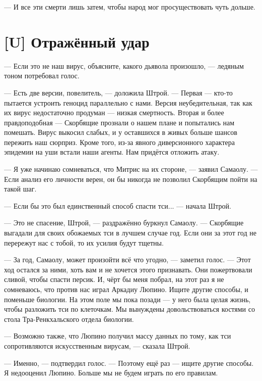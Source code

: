 --- И все эти смерти лишь затем, чтобы народ мог просуществовать чуть дольше.

\textspace

\section{[U] Отражённый удар}

\textspace

--- Если это не наш вирус, объясните, какого дьявола произошло, --- ледяным тоном потребовал голос.

--- Есть две версии, повелитель, --- доложила Штрой.
--- Первая --- кто-то пытается устроить геноцид параллельно с нами.
Версия неубедительная, так как их вирус недостаточно продуман --- низкая смертность.
Вторая и более правдоподобная --- Скорбящие прознали о нашем плане и попытались нам помешать.
Вирус выкосил слабых, и у оставшихся в живых больше шансов пережить наш сюрприз.
Кроме того, из-за явного диверсионного характера эпидемии на уши встали наши агенты.
Нам придётся отложить атаку.

--- Я уже начинаю сомневаться, что Митрис на их стороне, --- заявил Самаолу.
--- Если анализ его личности верен, он бы никогда не позволил Скорбящим пойти на такой шаг.

--- Если бы это был единственный способ спасти тси... --- начала Штрой.

--- Это не спасение, Штрой, --- раздражённо буркнул Самаолу.
--- Скорбящие выгадали для своих обожаемых тси в лучшем случае год.
Если они за этот год не перережут нас с тобой, то их усилия будут тщетны.

--- За год, Самаолу, может произойти всё что угодно, --- заметил голос.
--- Этот ход остался за ними, хоть вам и не хочется этого признавать.
Они пожертвовали сливой, чтобы спасти персик\FM.
И, чёрт бы меня побрал, на этот раз я не сомневаюсь, что против нас играл Аркадиу Люпино.
Ищите другие способы, и поменьше биологии.
На этом поле мы пока позади --- у него была целая жизнь, чтобы разложить тси по клеточкам.
Мы вынуждены довольствоваться костями со стола Тра-Ренкхальского отдела биологии.

--- Возможно также, что Люпино получил массу данных по тому, как тси сопротивляются искусственным вирусам, --- сказала Штрой.

--- Именно, --- подтвердил голос.
--- Поэтому ещё раз --- ищите другие способы.
Я недооценил Люпино.
Больше мы не будем играть по его правилам.

